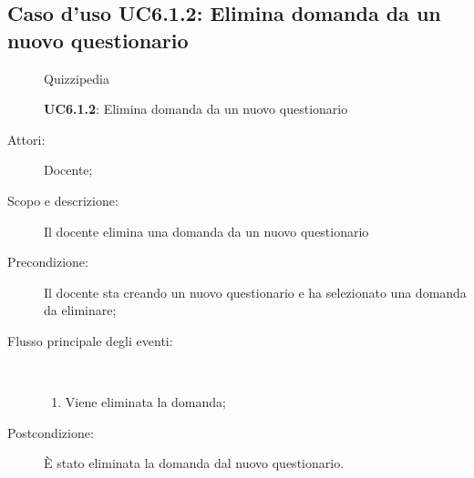 \subsection{Caso d'uso UC6.1.2: Elimina domanda da un nuovo questionario}
	\begin{figure}[H]
		\centering
		\begin{resizedtikzpicture}{\textwidth}
		\begin{umlsystem}[x=0, fill=lightgray!20]{Quizzipedia}
		\end{umlsystem}
		\end{resizedtikzpicture}
		\caption{\textbf{UC6.1.2}: Elimina domanda da un nuovo questionario}
		\label{UC6.1.2}
	\end{figure}
\begin{description}
\item[Attori:] Docente;
\item[Scopo e descrizione:] Il docente elimina una domanda da un nuovo questionario
      \item[Precondizione:] Il docente sta creando un nuovo questionario e ha selezionato una domanda da eliminare;

        \item[Flusso principale degli eventi:] \ 
 \begin{enumerate}
          \item Viene eliminata la domanda;

      \end{enumerate}
    \item[Postcondizione:] È stato eliminata la domanda dal nuovo questionario.
  \end{description}
\hypertarget{UC6.1.3}{}
